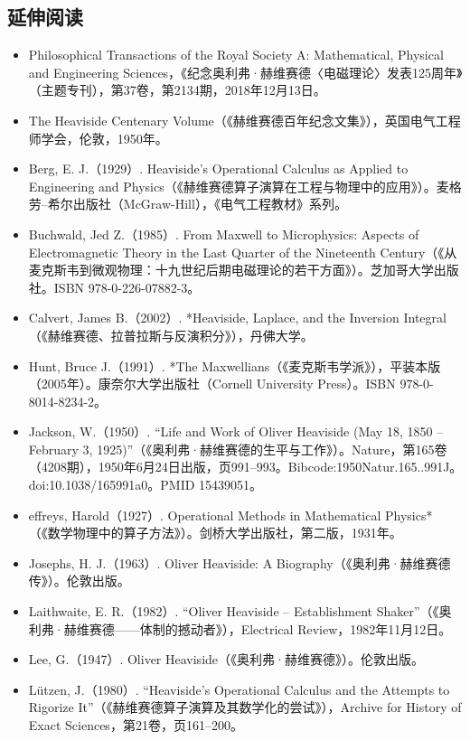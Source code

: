 \subsection{延伸阅读}
\begin{itemize}
\item Philosophical Transactions of the Royal Society A: Mathematical, Physical and Engineering Sciences，《纪念奥利弗·赫维赛德〈电磁理论〉发表125周年》（主题专刊），第37卷，第2134期，2018年12月13日。
\item The Heaviside Centenary Volume（《赫维赛德百年纪念文集》），英国电气工程师学会，伦敦，1950年。
\item Berg, E. J.（1929）. Heaviside’s Operational Calculus as Applied to Engineering and Physics（《赫维赛德算子演算在工程与物理中的应用》）。麦格劳–希尔出版社（McGraw-Hill），《电气工程教材》系列。
\item Buchwald, Jed Z.（1985）. From Maxwell to Microphysics: Aspects of Electromagnetic Theory in the Last Quarter of the Nineteenth Century（《从麦克斯韦到微观物理：十九世纪后期电磁理论的若干方面》）。芝加哥大学出版社。ISBN 978-0-226-07882-3。
\item Calvert, James B.（2002）. *Heaviside, Laplace, and the Inversion Integral（《赫维赛德、拉普拉斯与反演积分》），丹佛大学。
\item Hunt, Bruce J.（1991）. *The Maxwellians（《麦克斯韦学派》），平装本版（2005年）。康奈尔大学出版社（Cornell University Press）。ISBN 978-0-8014-8234-2。
\item Jackson, W.（1950）. “Life and Work of Oliver Heaviside (May 18, 1850 – February 3, 1925)”（《奥利弗·赫维赛德的生平与工作》）。Nature，第165卷（4208期），1950年6月24日出版，页991–993。Bibcode:1950Natur.165..991J。doi:10.1038/165991a0。PMID 15439051。
\item effreys, Harold（1927）. Operational Methods in Mathematical Physics*（《数学物理中的算子方法》）。剑桥大学出版社，第二版，1931年。
\item Josephs, H. J.（1963）. Oliver Heaviside: A Biography（《奥利弗·赫维赛德传》）。伦敦出版。
\item Laithwaite, E. R.（1982）. “Oliver Heaviside – Establishment Shaker”（《奥利弗·赫维赛德——体制的撼动者》），Electrical Review，1982年11月12日。
\item Lee, G.（1947）. Oliver Heaviside（《奥利弗·赫维赛德》）。伦敦出版。
\item Lützen, J.（1980）. “Heaviside’s Operational Calculus and the Attempts to Rigorize It”（《赫维赛德算子演算及其数学化的尝试》），Archive for History of Exact Sciences，第21卷，页161–200。

\end{itemize}
